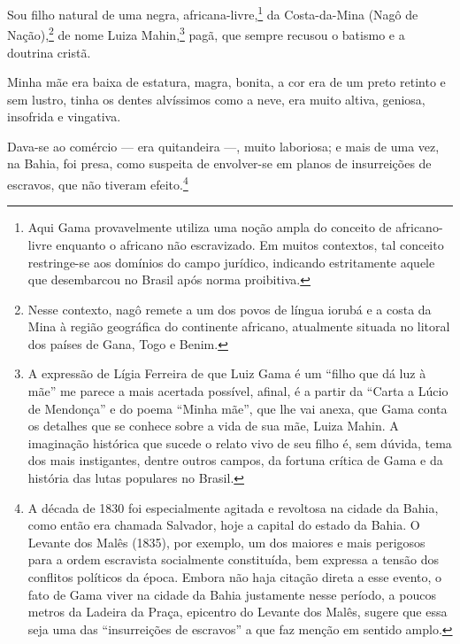 Sou filho natural de uma negra, africana-livre,\footnote{Aqui Gama \label{livre}
  provavelmente utiliza uma noção ampla do conceito de africano-livre
  enquanto o africano não escravizado. Em muitos contextos, tal conceito
  restringe-se aos domínios do campo jurídico, indicando estritamente
  aquele que desembarcou no Brasil após norma proibitiva.} da
Costa-da-Mina (Nagô de Nação),\footnote{Nesse contexto, nagô remete a \label{nago}
  um dos povos de língua iorubá e a costa da Mina à região geográfica do
  continente africano, atualmente situada no litoral dos países de Gana,
  Togo e Benim.} de nome Luiza Mahin,\footnote{A expressão de Lígia \label{mae}
  Ferreira de que Luiz Gama é um ``filho que dá luz à mãe'' me parece a
  mais acertada possível, afinal, é a partir da ``Carta a Lúcio de
  Mendonça'' e do poema ``Minha mãe'', que lhe vai anexa, que Gama
  conta os detalhes que se conhece sobre a vida de sua mãe, Luiza Mahin.
  A imaginação histórica que sucede o relato vivo de seu filho é, sem
  dúvida, tema dos mais instigantes, dentre outros campos, da fortuna
  crítica de Gama e da história das lutas populares no Brasil.} pagã,
que sempre recusou o batismo e a doutrina cristã.

Minha mãe era baixa de estatura, magra, bonita, a cor era de um preto
retinto e sem lustro, tinha os dentes alvíssimos como a neve, era muito
altiva, geniosa, insofrida e vingativa.

Dava-se ao comércio --- era quitandeira ---, muito laboriosa; e mais de
uma vez, na Bahia, foi presa, como suspeita de envolver-se em planos de
insurreições de escravos, que não tiveram efeito.\footnote{A década de
  1830 foi especialmente agitada e revoltosa na cidade da Bahia, como
  então era chamada Salvador, hoje a capital do estado da Bahia. O \label{males}
  Levante dos Malês (1835), por exemplo, um dos maiores e mais perigosos
  para a ordem escravista socialmente constituída, bem expressa a tensão
  dos conflitos políticos da época. Embora não haja citação direta a
  esse evento, o fato de Gama viver na cidade da Bahia justamente nesse
  período, a poucos metros da Ladeira da Praça, epicentro do Levante dos
  Malês, sugere que essa seja uma das ``insurreições de escravos'' a que
  faz menção em sentido amplo.}

